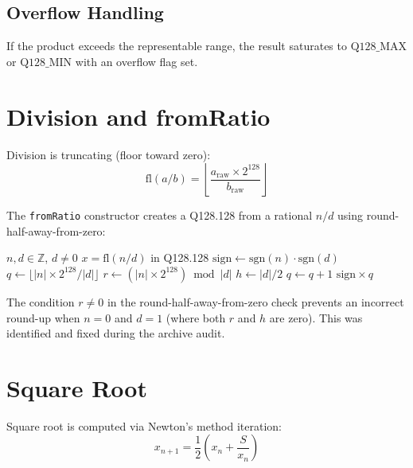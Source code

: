 \documentclass[11pt]{article}
\begin{document}
\subsection{Overflow Handling}

If the product exceeds the representable range, the result saturates to $\text{Q128\_MAX}$ or $\text{Q128\_MIN}$ with an overflow flag set.

\section{Division and fromRatio}

Division is truncating (floor toward zero):
\begin{equation}
\mathrm{fl}(a / b) = \left\lfloor \frac{a_{\text{raw}} \times 2^{128}}{b_{\text{raw}}} \right\rfloor
\end{equation}

The \texttt{fromRatio} constructor creates a Q128.128 from a rational $n/d$ using round-half-away-from-zero:

\begin{algorithm}
\caption{fromRatio}\label{alg:fromratio}
\begin{algorithmic}[1]
\Require $n, d \in \mathbb{Z}$, $d \neq 0$
\Ensure $x = \mathrm{fl}(n/d)$ in Q128.128
\State $\text{sign} \gets \mathrm{sgn}(n) \cdot \mathrm{sgn}(d)$
\State $q \gets \lfloor |n| \times 2^{128} / |d| \rfloor$
\State $r \gets (|n| \times 2^{128}) \bmod |d|$
\State $h \gets |d| / 2$ 
    \State $q \gets q + 1$ 
\EndIf
\State \Return $\text{sign} \times q$
\end{algorithmic}
\end{algorithm}

\begin{remark}
The condition $r \neq 0$ in the round-half-away-from-zero check prevents an incorrect round-up when $n = 0$ and $d = 1$ (where both $r$ and $h$ are zero). This was identified and fixed during the archive audit.
\end{remark}

\section{Square Root}

Square root is computed via Newton's method iteration:
\begin{equation}
x_{n+1} = \frac{1}{2}\left(x_n + \frac{S}{x_n}\right)
\end{equation}
\end{document}

